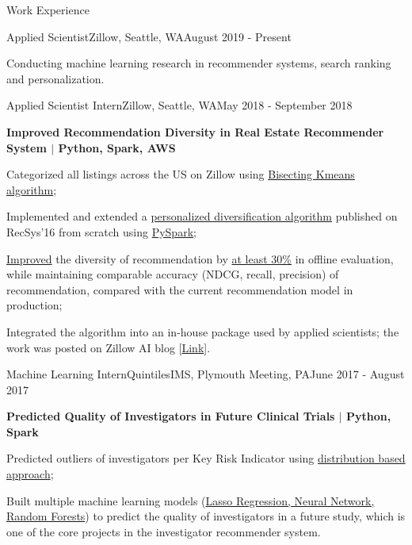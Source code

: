 \documentclass{my_resume} %
\begin{document}
\begin{rSection}{Work Experience}
  \begin{rSubsection}{Applied Scientist}{Zillow, Seattle, WA}{August 2019 -
    Present}

  \item[] Conducting machine learning research in recommender systems, search
    ranking and personalization.
  \end{rSubsection}

  \begin{rSubsection}{Applied Scientist Intern}{Zillow, Seattle,
    WA}{May 2018 - September 2018}

  \item[] \textbf{Improved Recommendation Diversity in Real Estate Recommender
      System
    $|$ Python, Spark, AWS}
  \item Categorized all listings across the US on Zillow using  
    \underline{Bisecting Kmeans algorithm};
  \item Implemented and extended a \underline{personalized diversification algorithm}
    published on RecSys'16 from scratch using \underline{PySpark};
  \item \underline{Improved} the diversity of recommendation by \underline{at
    least 30\%} in offline evaluation, while maintaining comparable accuracy
    (NDCG, recall, precision) of recommendation, compared with the current
    recommendation model in production;
  \item Integrated the algorithm into an in-house package used by applied
    scientists; the work was posted on Zillow AI blog
    [\href{https://www.zillow.com/data-science/personalized-recommendation-diversity/}{Link}].
  \end{rSubsection}

  \begin{rSubsection}{Machine Learning Intern}{QuintilesIMS, Plymouth Meeting,
    PA}{June 2017 - August 2017}

  \item[] \textbf{Predicted Quality of Investigators in Future Clinical Trials
    $|$ Python, Spark}
  \item Predicted outliers of investigators per Key Risk Indicator using
    \underline{distribution based approach};
  \item Built multiple machine learning models (\underline{Lasso Regression, Neural
    Network, Random Forests}) to predict the quality of investigators in a
    future study, which is one of the core projects in the investigator
    recommender system.
  \end{rSubsection}


\end{rSection}
\end{document}
